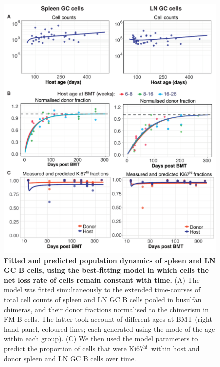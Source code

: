 \documentclass[11pt]{article}
\newcommand{\khi}{Ki67$^\text{hi}$}
\begin{document}
\begin{figure}[h!]
	\centerline{\includegraphics[scale = 0.8] {Results_GC.pdf}}
	\caption{\small \textbf{Fitted and predicted population dynamics of spleen and LN GC B cells, using the best-fitting model in which cells the net loss rate of cells remain constant with time.}  (A) The model was fitted simultaneously to the extended time-courses of total cell counts of spleen and LN GC B cells pooled in busulfan chimeras,  and their donor fractions normalised to the chimerism in FM B cells. The latter took account of different ages at BMT (right-hand panel, coloured lines; each generated using the  mode of the age within each group). (C) We then used the model parameters to predict the proportion of cells that were \khi\ within host and donor spleen and LN GC B cells over time.}
	\label{fig:results_GC}
\end{figure}
\end{document}
